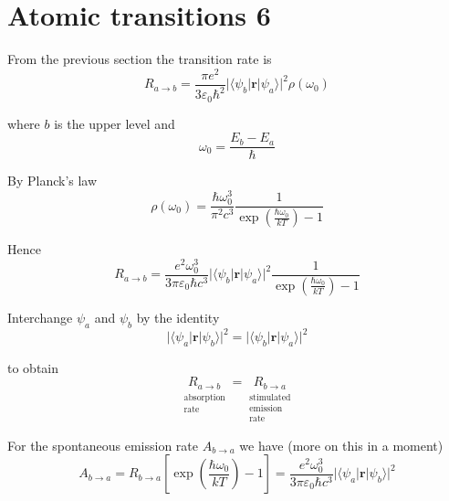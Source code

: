 

\section*{Atomic transitions 6}

From the previous section the transition rate is
\begin{equation*}
R_{a\rightarrow b}
=\frac{\pi e^2}{3\varepsilon_0\hbar^2}
\bigl|\langle\psi_b|\mathbf r|\psi_a\rangle\bigr|^2\rho(\omega_0)
\end{equation*}

where $b$ is the upper level and
\begin{equation*}
\omega_0=\frac{E_b-E_a}{\hbar}
\end{equation*}

By Planck's law
\begin{equation*}
\rho(\omega_0)=\frac{\hbar\omega_0^3}{\pi^2c^3}
\frac{1}{\exp\left(\frac{\hbar\omega_0}{kT}\right)-1}
\end{equation*}

Hence
\begin{equation*}
R_{a\rightarrow b}
=\frac{e^2\omega_0^3}{3\pi\varepsilon_0\hbar c^3}
\bigl|\langle\psi_b|\mathbf r|\psi_a\rangle\bigr|^2
\frac{1}{\exp\left(\frac{\hbar\omega_0}{kT}\right)-1}
\tag{1}
\end{equation*}

Interchange $\psi_a$ and $\psi_b$ by the identity
\begin{equation*}
\bigl|\langle\psi_a|\mathbf r|\psi_b\rangle\bigr|^2
=\bigl|\langle\psi_b|\mathbf r|\psi_a\rangle\bigr|^2
\end{equation*}

to obtain
\begin{equation*}
\underset{\substack{\text{absorption}\\\text{rate}}}{R_{a\rightarrow b}}=
\underset{\substack{\text{stimulated}\\\text{emission}\\\text{rate}}}{R_{b\rightarrow a}}
\end{equation*}

For the spontaneous emission rate $A_{b\rightarrow a}$ we have (more on this in a moment)
\begin{equation*}
A_{b\rightarrow a}=R_{b\rightarrow a}
\left[\exp\left(\frac{\hbar\omega_0}{kT}\right)-1\right]
=\frac{e^2\omega_0^3}{3\pi\varepsilon_0\hbar c^3}
\bigl|\langle\psi_a|\mathbf r|\psi_b\rangle\bigr|^2
\tag{2}
\end{equation*}

